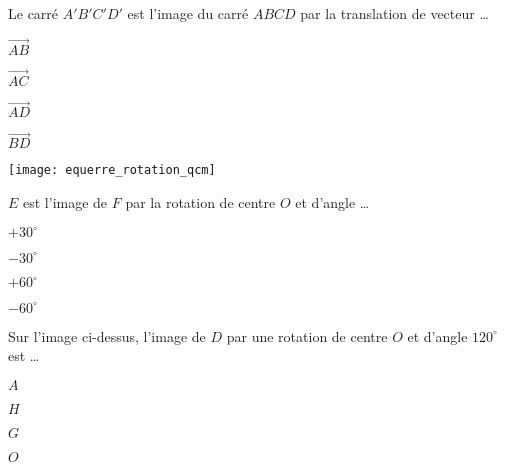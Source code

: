 

\begin{QCM}
  \begin{GroupeQCM}
    \begin{exercice}
       \begin{center}  \end{center}
       Le carré $A'B'C'D'$ est l'image du carré $ABCD$ par la translation de vecteur \ldots
      \begin{ChoixQCM}{4}
      \item $\overrightarrow{AB}$
      \item $\overrightarrow{AC}$
      \item $\overrightarrow{AD}$
      \item $\overrightarrow{BD}$
      \end{ChoixQCM}
\begin{corrige}
   \end{corrige}
    \end{exercice}
    
    
    \begin{exercice}
      \begin{center} \texttt{[image: equerre\_rotation\_qcm]} \end{center}
      $E$ est l'image de $F$ par la rotation de centre $O$ et d'angle \ldots
      \begin{ChoixQCM}{4}
      \item $+ 30^\circ$
      \item $- 30^\circ$
      \item $+ 60^\circ$
      \item $- 60^\circ$
      \end{ChoixQCM}
\begin{corrige}
   \end{corrige}
    \end{exercice}
    
    
    \begin{exercice}
      Sur l'image ci-dessus, l'image de $D$ par une rotation de centre $O$ et d'angle $120^\circ$ est \ldots
      \begin{ChoixQCM}{4}
      \item $A$
      \item $H$
      \item $G$
      \item $O$
      \end{ChoixQCM}
\begin{corrige}
   \end{corrige}
    \end{exercice}


\end{GroupeQCM}
\end{QCM}

  
